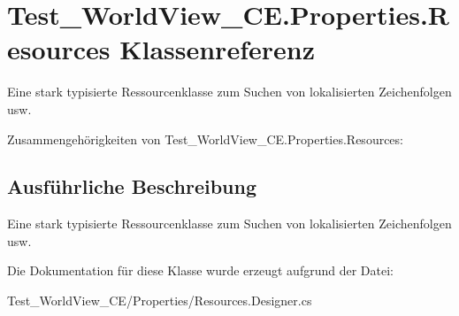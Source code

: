 \hypertarget{class_test___world_view___c_e_1_1_properties_1_1_resources}{
\section{Test\_\-WorldView\_\-CE.Properties.Resources Klassenreferenz}
\label{class_test___world_view___c_e_1_1_properties_1_1_resources}
}


Eine stark typisierte Ressourcenklasse zum Suchen von lokalisierten Zeichenfolgen usw.  




Zusammengehörigkeiten von Test\_\-WorldView\_\-CE.Properties.Resources:

\subsection{Ausführliche Beschreibung}
Eine stark typisierte Ressourcenklasse zum Suchen von lokalisierten Zeichenfolgen usw. 

Die Dokumentation für diese Klasse wurde erzeugt aufgrund der Datei:\begin{DoxyCompactItemize}
\item 
Test\_\-WorldView\_\-CE/Properties/Resources.Designer.cs\end{DoxyCompactItemize}
